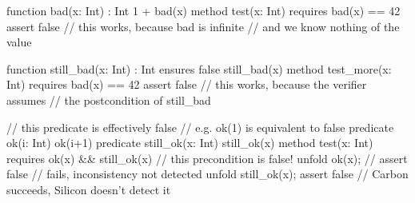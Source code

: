 function bad(x: Int) : Int { 
    1 + bad(x) 
}
method test(x: Int) 
    requires bad(x) == 42
{
    assert false 
    // this works, because bad is infinite 
    // and we know nothing of the value
}

function still_bad(x: Int) : Int 
    ensures false
{ 
    still_bad(x) 
}
method test_more(x: Int) 
    requires bad(x) == 42
{ 
    assert false 
    // this works, because the verifier assumes 
    // the postcondition of still_bad
}

// this predicate is effectively false
// e.g. ok(1) is equivalent to false
predicate ok(i: Int) { 
    ok(i+1) 
}
predicate still_ok(x: Int) { 
    still_ok(x) 
}
method test(x: Int)
    requires ok(x) && still_ok(x) // this precondition is false!
{
    unfold ok(x);
    // assert false // fails, inconsistency not detected 
    unfold still_ok(x);
    assert false // Carbon succeeds, Silicon doesn’t detect it
}